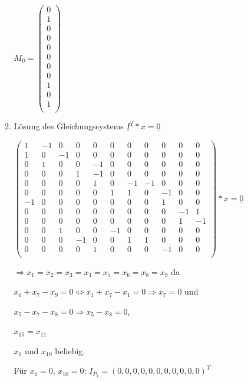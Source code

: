 \documentclass{scrreprt}
\begin{document}
\begin{enumerate}
\begin{enumerate}
\( M_0 = \begin{pmatrix}
0 \\ %
1 \\ %
0 \\ %
0 \\ %
0 \\ %
0 \\ %
0 \\ %
0 \\ %
1 \\ %
0 \\ %
1 \\ %
\end{pmatrix} \)

\item Lösung des Gleichungssystems \( \underline{I}^T * x = \underline{0} \)

\( \begin{pmatrix}
 1 &-1 & 0 & 0 & 0 & 0 & 0 & 0 & 0 & 0 & 0  \\
 1 & 0 &-1 & 0 & 0 & 0 & 0 & 0 & 0 & 0 & 0  \\
 0 & 1 & 0 & 0 &-1 & 0 & 0 & 0 & 0 & 0 & 0  \\
 0 & 0 & 0 & 1 &-1 & 0 & 0 & 0 & 0 & 0 & 0  \\
 0 & 0 & 0 & 0 & 1 & 0 &-1 &-1 & 0 & 0 & 0  \\
 0 & 0 & 0 & 0 & 0 & 1 & 1 & 0 &-1 & 0 & 0  \\
-1 & 0 & 0 & 0 & 0 & 0 & 0 & 0 & 1 & 0 & 0  \\
 0 & 0 & 0 & 0 & 0 & 0 & 0 & 0 & 0 &-1 & 1  \\
 0 & 0 & 0 & 0 & 0 & 0 & 0 & 0 & 0 & 1 &-1  \\
 0 & 0 & 1 & 0 & 0 &-1 & 0 & 0 & 0 & 0 & 0  \\
 0 & 0 & 0 &-1 & 0 & 0 & 1 & 1 & 0 & 0 & 0  \\
 0 & 0 & 0 & 0 & 1 & 0 & 0 & 0 &-1 & 0 & 0  \\
\end{pmatrix} * x = \underline{0}\)

\( \Rightarrow x_1 = x_2 = x_3 = x_4 = x_5 = x_6 = x_8 = x_9\) da

\( x_6 + x_7 - x_9 = 0 \Leftrightarrow x_1 + x_7 - x_1 = 0 \Rightarrow x_7 = 0 \) und

\( x_5 - x_7 - x_8 = 0 \Rightarrow x_5 - x_8 = 0 \),

\( x_{10} = x_{11} \)

\( x_1 \) und \( x_{10} \) beliebig.

Für \(x_1=0\), \(x_{10}=0\): \(I_{P_1} = (0, 0, 0, 0, 0, 0, 0, 0, 0, 0, 0)^T\)


\end{enumerate}
\end{enumerate}
\end{document}
